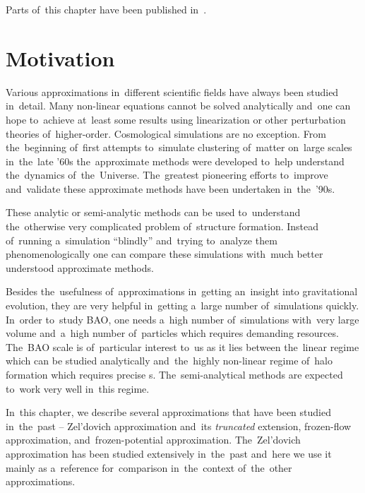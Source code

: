 Parts of~this chapter have been published in~\textcite{2020MNRAS.493.2085V}.

\section{Motivation}
Various approximations in~different scientific fields have always been studied in~detail. Many non-linear equations cannot be solved analytically and~one can hope to~achieve at~least some results using linearization or other perturbation theories of~higher-order. Cosmological simulations are no exception. From the~beginning of~first attempts to~simulate clustering of~matter on~large scales in~the~late '60s the~approximate methods were developed to~help understand the~dynamics of~the~Universe. The~greatest pioneering efforts to~improve and~validate these approximate methods have been undertaken in~the~'90s.

These analytic or semi-analytic methods can be used to~understand the~otherwise very complicated problem of~structure formation. Instead of~running a~simulation ``blindly'' and~trying to~analyze them phenomenologically one can compare these simulations with~much better understood approximate methods.

Besides the~usefulness of~approximations in~getting an~insight into gravitational evolution, they are very helpful in~getting a~large number of~simulations quickly. In~order to~study BAO, one needs a~high number of~simulations with~very large volume and~a~high number of~particles which requires demanding resources. The~BAO scale is of~particular interest to~us as it lies between the~linear regime which can be studied analytically and~the~highly non-linear regime of~halo formation which requires precise \nbodysim s. The~semi-analytical methods are expected to~work very well in~this regime.

In~this chapter, we describe several approximations that have been studied in~the~past -- Zel'dovich approximation and~its \textit{truncated} extension, frozen-flow approximation, and~frozen-potential approximation. The~Zel'dovich approximation has been studied extensively in~the~past and~here we use it mainly as a~reference for~comparison in~the~context of~the~other approximations.


